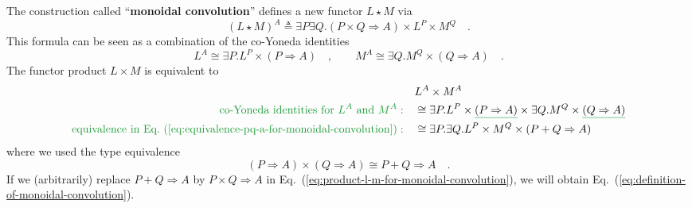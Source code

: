 The construction called ``\textbf{monoidal convolution}''
defines a new functor $L\star M$ via 
\begin{equation}
\left(L\star M\right)^{A}\triangleq\exists P\exists Q.\left(P\times Q\Rightarrow A\right)\times L^{P}\times M^{Q}\quad.\label{eq:definition-of-monoidal-convolution}
\end{equation}
This formula can be seen as a combination of the co-Yoneda identities
\[
L^{A}\cong\exists P.L^{P}\times\left(P\Rightarrow A\right)\quad,\quad\quad M^{A}\cong\exists Q.M^{Q}\times\left(Q\Rightarrow A\right)\quad.
\]
The functor product $L\times M$ is equivalent to
\begin{align}
 & L^{A}\times M^{A}\nonumber \\
{\color{greenunder}\text{co-Yoneda identities for }L^{A}\text{ and }M^{A}:}\quad & \cong\exists P.L^{P}\times\gunderline{\left(P\Rightarrow A\right)}\times\exists Q.M^{Q}\times\gunderline{\left(Q\Rightarrow A\right)}\nonumber \\
{\color{greenunder}\text{equivalence in Eq.~(\ref{eq:equivalence-pq-a-for-monoidal-convolution})}:}\quad & \cong\exists P.\exists Q.L^{P}\times M^{Q}\times\left(P+Q\Rightarrow A\right)\label{eq:product-l-m-for-monoidal-convolution}
\end{align}
where we used the type equivalence 
\begin{equation}
\left(P\Rightarrow A\right)\times\left(Q\Rightarrow A\right)\cong P+Q\Rightarrow A\quad.\label{eq:equivalence-pq-a-for-monoidal-convolution}
\end{equation}
If we (arbitrarily) replace $P+Q\Rightarrow A$ by $P\times Q\Rightarrow A$
in Eq.~(\ref{eq:product-l-m-for-monoidal-convolution}), we will
obtain Eq.~(\ref{eq:definition-of-monoidal-convolution}).

